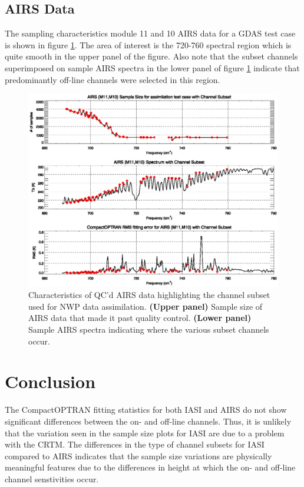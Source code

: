 \subsection{AIRS Data}
The sampling characteristics module 11 and 10 AIRS data for a GDAS test case is shown in figure \ref{fig:airs_characteristics}. The area of interest is the 720-760\invcm{} spectral region which is quite smooth in the upper panel of the figure. Also note that the subset channels superimposed on sample AIRS spectra in the lower panel of figure \ref{fig:airs_characteristics} indicate that predominantly off-line channels were selected in this region.
\begin{figure}[htp]
  \centering
  \includegraphics[bb=70 340 540 571,clip,scale=0.8]{graphics/airs_characteristics.eps}
  \caption{Characteristics of QC'd AIRS data highlighting the channel subset used for NWP data assimilation. \textbf{(Upper panel)} Sample size of AIRS data that made it past quality control. \textbf{(Lower panel)} Sample AIRS spectra indicating where the various subset channels occur.}
  \label{fig:airs_characteristics}
\end{figure}


\section{Conclusion}
The CompactOPTRAN fitting statistics for both IASI and AIRS do not show significant differences between the on- and off-line channels. Thus, it is unlikely that the variation seen in the sample size plots for IASI are due to a problem with the CRTM. The differences in the type of channel subsets for IASI compared to AIRS indicates that the sample size variations are physically meaningful features due to the differences in height at which the on- and off-line channel senstivities occur.









